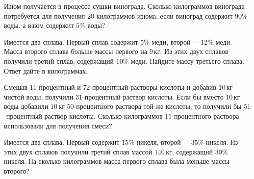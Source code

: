 \begin{class}[number=1]
\begin{listofex}
		\item Изюм получается в процессе сушки винограда. Сколько килограммов винограда потребуется для получения \(20\) килограммов изюма, если виноград содержит \(90\%\) воды, а изюм содержит \(5\%\) воды?
		\item Имеется два сплава. Первый сплав содержит \(5\%\) меди, второй --- \(12\%\) меди. Масса второго сплава больше массы первого на \(9\) кг. Из этих двух сплавов получили третий сплав, содержащий \(10\%\) меди. Найдите массу третьего сплава. Ответ дайте в килограммах.
		
		\item Смешав \(11\)-процентный и \(72\)-процентный растворы кислоты и добавив \(10\) кг чистой воды, получили \(31\)-процентный раствор кислоты. Если бы вместо \(10\) кг воды добавили \(10\) кг \(50\)-процентного раствора той же кислоты, то получили бы \(51\)-процентный раствор кислоты. Сколько килограммов \(11\)-процентного раствора использовали для получения смеси?
		
		\item Имеется два сплава. Первый содержит \(15\%\) никеля, второй --- \(35\%\) никеля. Из этих двух сплавов получили третий сплав массой \(140\) кг, содержащий \(30\%\) никеля. На сколько килограммов масса первого сплава была меньше массы второго?
		

\end{listofex}
\end{class}
